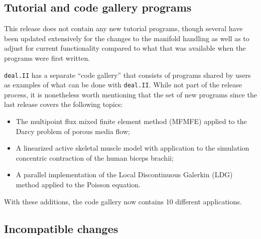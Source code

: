 \documentclass{ansarticle-preprint}
\newcommand{\specialword}[1]{\texttt{#1}}
\newcommand{\dealii}{{\specialword{deal.II}}\xspace}
\begin{document}
\subsection{Tutorial and code gallery programs}

This release does not contain any new tutorial programs, though
several have been updated extensively for the changes to the manifold
handling as well as to adjust for current functionality
compared to what that was available when the programs were first written.

\dealii has a separate ``code gallery'' that
consists of programs shared by users as examples of what can be
done with \dealii. While not part of the release process, it is nonetheless
worth mentioning that the set of new programs since the last release covers
the following topics:
\begin{itemize}
\item The multipoint flux mixed finite element method (MFMFE) applied
  to the Darcy problem of porous media flow;
\item A linearized active skeletal muscle model with application to
  the simulation concentric contraction of the human biceps brachii;
\item A parallel implementation of the Local Discontinuous Galerkin
  (LDG) method applied to the Poisson equation.
\end{itemize}
With these additions, the code gallery now contains 10 different applications.


\subsection{Incompatible changes}
\end{document}
